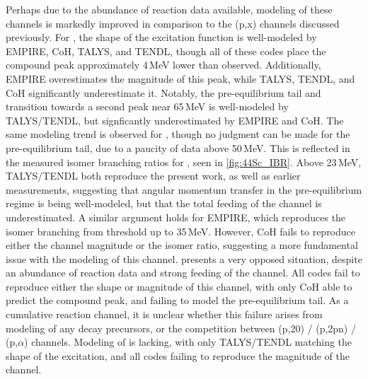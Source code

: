 Perhaps due to the abundance of reaction data available, modeling of these channels is markedly improved  in comparison to the (p,x) channels discussed previously.
For , the shape of the excitation function is well-modeled by EMPIRE, CoH, TALYS, and TENDL, though all of these codes place the compound peak approximately 4\,MeV lower than observed.
Additionally, EMPIRE overestimates the magnitude of this peak, while TALYS, TENDL, and CoH significantly underestimate it.
Notably, the pre-equilibrium tail and transition towards a second peak near 65\,MeV is well-modeled by TALYS/TENDL, but signficantly underestimated by EMPIRE and CoH.
The same modeling trend is observed for , though no judgment can be made for the pre-equilibrium tail, due to a paucity of data above 50\,MeV.
This is reflected in the measured isomer branching ratios for , seen in \autoref{fig:44Sc_IBR}.
Above 23\,MeV, TALYS/TENDL both reproduce the present work, as well as earlier measurements, suggesting that angular momentum transfer in the pre-equilibrium regime is being well-modeled, but that the total feeding of the  channel is  underestimated. 
A similar argument holds for EMPIRE, which reproduces the isomer branching from threshold up to 35\,MeV.
However, CoH fails to reproduce either the channel magnitude or the isomer ratio, suggesting a more fundamental issue with the modeling of this channel. 
 presents a very opposed situation, despite an abundance of reaction data and strong feeding of the channel.
All codes fail to reproduce either the shape or magnitude of this channel, with only CoH able to predict the compound peak,  and failing to model the pre-equilibrium tail.
As a cumulative reaction channel, it is unclear whether this failure arises from modeling of any  decay precursors, or the competition between  (p,20) / (p,2pn) / (p,$\alpha$) channels. 
Modeling of  is lacking, with only TALYS/TENDL matching the shape of the excitation, and all codes failing to reproduce the magnitude of the channel.




